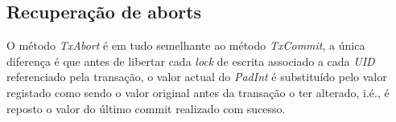 \subsection{Recuperação de aborts}

O método \textit{TxAbort} é em tudo semelhante ao método \textit{TxCommit}, a única diferença é que antes de libertar cada \textit{lock} de escrita associado a cada \textit{UID} referenciado pela transação, o valor actual do \textit{PadInt} é substituído pelo valor registado como sendo o valor original antes da transação o ter alterado, i.é., é reposto o valor do último commit realizado com sucesso. 
